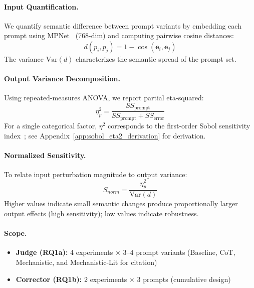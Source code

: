 \paragraph{Input Quantification.}
We quantify semantic difference between prompt variants by embedding each prompt using MPNet~\cite{song2020mpnet} (768-dim) and computing pairwise cosine distances:
\begin{equation}
d(p_i, p_j) = 1 - \cos(\mathbf{e}_i, \mathbf{e}_j)
\end{equation}
The variance $\text{Var}(d)$ characterizes the semantic spread of the prompt set.

\paragraph{Output Variance Decomposition.}
Using repeated-measures ANOVA, we report partial eta-squared:
\begin{equation}
\eta^2_p = \frac{SS_{\text{prompt}}}{SS_{\text{prompt}} + SS_{\text{error}}}
\end{equation}
For a single categorical factor, $\eta^2$ corresponds to the first-order Sobol sensitivity index~\cite{saltelli2010variance}; see Appendix~\ref{app:sobol_eta2_derivation} for derivation.

\paragraph{Normalized Sensitivity.}
To relate input perturbation magnitude to output variance:
\begin{equation}
S_{norm} = \frac{\eta^2_p}{\text{Var}(d)}
\end{equation}
Higher values indicate small semantic changes produce proportionally larger output effects (high sensitivity); low values indicate robustness.

\paragraph{Scope.}
\begin{itemize}[noitemsep]
    \item \textbf{Judge (RQ1a):} 4 experiments $\times$ 3--4 prompt variants (Baseline, CoT, Mechanistic, and Mechanistic-Lit for citation)
    \item \textbf{Corrector (RQ1b):} 2 experiments $\times$ 3 prompts (cumulative design)
\end{itemize}

